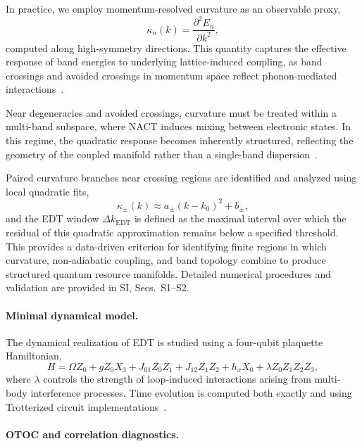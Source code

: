 \documentclass[twocolumn,10pt]{article}
\begin{document}
In practice, we employ momentum-resolved curvature as an observable proxy,
\begin{equation}
\kappa_n(k) = \frac{\partial^2 E_n}{\partial k^2},
\end{equation}
computed along high-symmetry directions. This quantity captures the effective response of band energies to underlying lattice-induced coupling, as band crossings and avoided crossings in momentum space reflect phonon-mediated interactions~\cite{Xiao2010}.

Near degeneracies and avoided crossings, curvature must be treated within a multi-band subspace, where NACT induces mixing between electronic states. In this regime, the quadratic response becomes inherently structured, reflecting the geometry of the coupled manifold rather than a single-band dispersion~\cite{Berry1984}.

Paired curvature branches near crossing regions are identified and analyzed using local quadratic fits,
\begin{equation}
\kappa_\pm(k) \approx a_\pm (k-k_0)^2 + b_\pm,
\end{equation}
and the EDT window $\Delta k_{\mathrm{EDT}}$ is defined as the maximal interval over which the residual of this quadratic approximation remains below a specified threshold. This provides a data-driven criterion for identifying finite regions in which curvature, non-adiabatic coupling, and band topology combine to produce structured quantum resource manifolds. Detailed numerical procedures and validation are provided in SI, Secs.~S1--S2.

\paragraph*{Minimal dynamical model.}

The dynamical realization of EDT is studied using a four-qubit plaquette Hamiltonian,
\begin{equation}
H = \Omega Z_0 + g Z_0 X_3 + J_{01} Z_0 Z_1 + J_{12} Z_1 Z_2 + h_x X_0 + \lambda Z_0 Z_1 Z_2 Z_3,
\end{equation}
where $\lambda$ controls the strength of loop-induced interactions arising from multi-body interference processes. Time evolution is computed both exactly and using Trotterized circuit implementations~\cite{Lloyd1996,Trotter1959,Suzuki1990,Childs2019}.

\paragraph*{OTOC and correlation diagnostics.}
\end{document}
